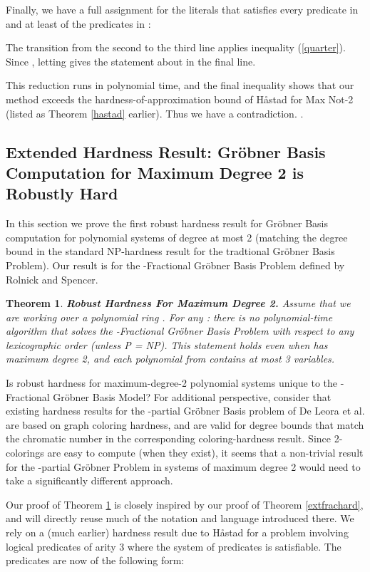 \documentclass{article}
\newtheorem{theorem}{Theorem}[]
\begin{document}
Finally, we have a full assignment for the literals  that satisfies every predicate in  and at least  of the predicates in :


The transition from the second to the third line applies inequality (\ref{quarter}). Since , letting  gives the statement about  in the final line. 

This reduction runs in polynomial time, and the
final inequality shows that our method exceeds the hardness-of-approximation bound of H{\aa}stad for Max Not-2 (listed as Theorem \ref{hastad} earlier). Thus we have a contradiction. .




\subsection{Extended Hardness Result: Gr\"{o}bner Basis Computation for Maximum Degree 2 is Robustly Hard} \label{deg2sec}

In this section we prove the first robust hardness result for Gr\"{o}bner Basis computation for polynomial systems of degree at most 2 (matching the degree bound in the standard NP-hardness result for the tradtional Gr\"{o}bner Basis Problem). Our result is for the -Fractional Gr\"{o}bner Basis Problem defined by Rolnick and Spencer.  

\begin{theorem} \textbf{Robust Hardness For Maximum Degree 2.} \label{extfracharddeg2}
Assume that we are working over a polynomial ring . For any : there is no polynomial-time algorithm  that solves the -Fractional Gr\"{o}bner Basis Problem with respect to any lexicographic order (unless P = NP). This statement holds even when  has maximum degree 2, and each polynomial from  contains at most 3 variables.
\end{theorem}

Is robust hardness for maximum-degree-2 polynomial systems unique to the -Fractional Gr\"{o}bner Basis Model? For additional perspective, consider that existing hardness results for the -partial Gr\"{o}bner Basis problem of De Leora et al. are based on graph coloring hardness, and are valid for degree bounds that match the chromatic number in the corresponding coloring-hardness result. Since 2-colorings are easy to compute (when they exist), it seems that a non-trivial result for the -partial Gr\"{o}bner Problem in systems of maximum degree 2 would need to take a significantly different approach. 

Our proof of Theorem \ref{extfracharddeg2} is closely inspired by our proof of Theorem \ref{extfrachard}, and will directly reuse much of the notation and language introduced there.  We rely on a (much earlier) hardness result due to H{\aa}stad for a problem involving logical predicates of arity 3 where the system of predicates is satisfiable.  The predicates are now of the following form:
\vspace{-5mm}
\end{document}
